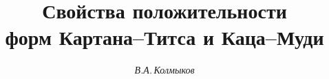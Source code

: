 

 


% 


 


\newcommand{\ad}{\operatorname{ad}} 




\newcommand{\tts}[1]{} 


\renewcommand{\baselinestretch}{1.03}


 




\setcounter{page}{37} 












 


\author{\it В.А.\,Колмыков} 




\title{Свойства положительности \\ 


форм Картана--Титса и Каца--Муди} 


 


\date{} 




\pagestyle{plain} %


 




\maketitle 


